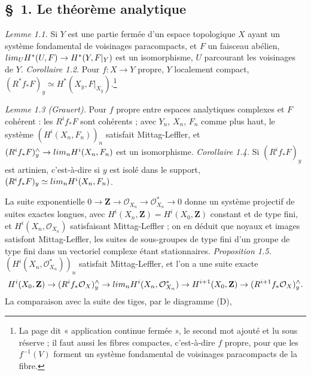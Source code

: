 \documentclass[11pt,a4paper]{article}
\begin{document}
\subsection*{§~1. Le théorème analytique}

\emph{Lemme 1.1.} Si $Y$ est une partie fermée d'un espace topologique $X$
ayant un système fondamental de voisinages paracompacts, et $F$ un faisceau
abélien, $\varinjlim_U H^*(U, F) \to H^*(Y, F|_Y)$ est un isomorphisme, $U$
parcourant les voisinages de $Y$. \emph{Corollaire 1.2.} Pour
$f \colon X \to Y$ propre, $Y$ localement compact, $(R^* f_*F)_y \simeq H^*(X_y, F|_{X_y})$.\footnote{La
page dit « application continue fermée », le second mot ajouté et lu sous
réserve ; il faut aussi les fibres compactes, c'est-à-dire $f$ propre, pour que
les $f^{-1}(V)$ forment un système fondamental de voisinages paracompacts de la
fibre.}

\emph{Lemme 1.3 (Grauert).} Pour $f$ propre entre espaces analytiques complexes
et $F$ cohérent : les $R^i f_*F$ sont cohérents ; avec $Y_n$, $X_n$, $F_n$ comme
plus haut, le système $(H^i(X_n, F_n))_n$ satisfait Mittag-Leffler, et
$(R^i f_*F)^\wedge_y \to \varprojlim_n H^i(X_n, F_n)$ est un isomorphisme.
\emph{Corollaire 1.4.} Si $(R^i f_*F)_y$ est artinien, c'est-à-dire si $y$ est
isolé dans le support, $(R^i f_*F)_y \simeq \varprojlim_n H^i(X_n, F_n)$.

La suite exponentielle $0 \to \mathbf{Z} \to \mathcal{O}_{X_n} \to \mathcal{O}^*_{X_n} \to 0$
donne un système projectif de suites exactes longues, avec
$H^i(X_n, \mathbf{Z}) = H^i(X_0, \mathbf{Z})$ constant et de type fini, et
$H^i(X_n, \mathcal{O}_{X_n})$ satisfaisant Mittag-Leffler ; on en déduit que
noyaux et images satisfont Mittag-Leffler, les suites de sous-groupes de type
fini d'un groupe de type fini dans un vectoriel complexe étant stationnaires.
\emph{Proposition 1.5.} $(H^i(X_n, \mathcal{O}^*_{X_n}))_n$ satisfait
Mittag-Leffler, et l'on a une suite exacte
\[
H^i(X_0, \mathbf{Z}) \to (R^i f_*\mathcal{O}_X)^\wedge_y \to \varprojlim_n H^i(X_n, \mathcal{O}^*_{X_n}) \to H^{i+1}(X_0, \mathbf{Z}) \to (R^{i+1} f_*\mathcal{O}_X)^\wedge_y .
\]
La comparaison avec la suite des tiges, par le diagramme (D),

\end{document}
